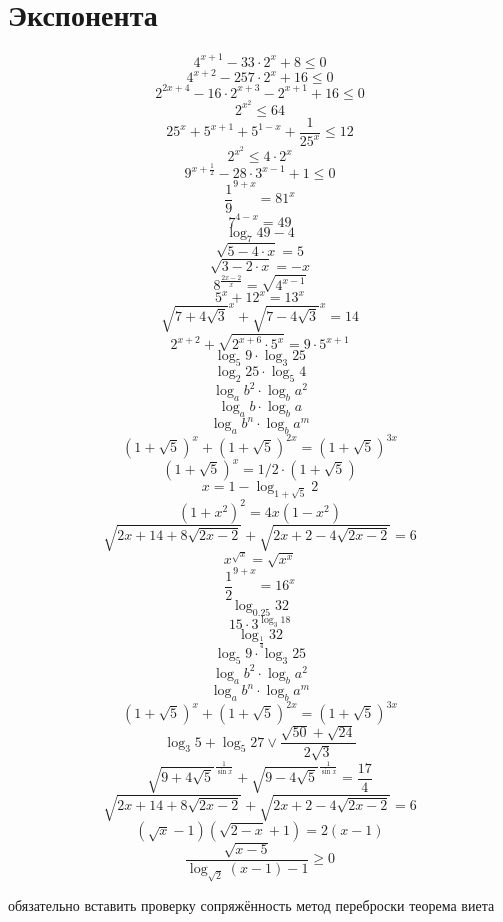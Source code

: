 \documentclass{article}
\begin{document}

\section{Экспонента}
$$4^{x+1}-33\cdot{}2^{x}+8\le{}0$$
$$4^{x+2}-257\cdot{}2^{x}+16\le{}0$$
$$2^{2x+4}-16\cdot{}2^{x+3}-2^{x+1}+16\le{}0$$
$$2^{x^2}\le{}64$$
$$25^{x}+5^{x+1}+5^{1-x}+\frac{1}{25^x}\le{}12$$
$$2^{x^2}\le{}4\cdot{}2^x$$
$$9^{x+\frac{1}{2}}-28\cdot{}3^{x-1}+1\le0$$
$${\frac{1}{9}}^{9+x}=81^{x}$$
$$7^{4-x}=49$$
$$\log_{7}{49}-4$$
$$\sqrt{5-4\cdot{}x}=5$$
$$\sqrt{3-2\cdot{}x}=-x$$
$$8^{\frac{2x-2}{x}}=\sqrt{4^{x-1}}$$
$$5^x+12^x=13^x$$
$$\sqrt{7+4\sqrt{3}}^{x}+\sqrt{7-4\sqrt{3}}^{x}=14$$
$$2^{x+2}+\sqrt{2^{x+6}\cdot{}5^x}=9\cdot{}5^{x+1}$$
$$\log_{5}{9}\cdot{}\log_{3}{25}$$
$$\log_{2}{25}\cdot{}\log_{5}{4}$$
$$\log_{a}{b^2}\cdot{}\log_{b}{a^2}$$
$$\log_{a}{b}\cdot{}\log_{b}{a}$$
$$\log_{a}{b^n}\cdot{}\log_{b}{a^m}$$
$$(1+\sqrt{5})^{x}+(1+\sqrt{5})^{2x}=(1+\sqrt{5})^{3x}$$
$$(1+\sqrt{5})^x=1/2\cdot(1+\sqrt{5})$$
$$x=1-\log_{1+\sqrt{5}}{2}$$
$$(1+x^2)^2=4x(1-x^2)$$
$$\sqrt{2x+14+8\sqrt{2x-2}}+\sqrt{2x+2-4\sqrt{2x-2}}=6$$
$$x^{\sqrt{x}}=\sqrt{x^x}$$
$${\frac{1}{2}}^{9+x}=16^{x}$$
$$\log_{0.25}{32}$$
$$15\cdot{}3^{\log_{3}{18}}$$
$$\log_{\frac{1}{4}}{32}$$
$$\log_{5}{9}\cdot\log_{3}{25}$$
$$\log_{a}{b^2}\cdot\log_{b}{a^2}$$
$$\log_a{b^n}\cdot\log_b{a^m}$$
$$(1+\sqrt{5})^x+(1+\sqrt{5})^{2x}=(1+\sqrt{5})^{3x}$$
$$\log_{3}{5}+\log_5{27} \vee \frac{\sqrt{50}+\sqrt{24}}{2\sqrt{3}}$$
$$\sqrt{9+4\sqrt{5}}^{\frac{1}{\sin{x}}}+\sqrt{9-4\sqrt{5}}^{\frac{1}{\sin{x}}}=\frac{17}{4}$$
$$\sqrt{2x+14+8\sqrt{2x-2}}+\sqrt{2x+2-4\sqrt{2x-2}}=6$$
$$(\sqrt{x}-1)(\sqrt{2-x}+1)=2(x-1)$$
$$\frac{\sqrt{x-5}}{\log_{\sqrt{2}}{(x-1)}-1}\ge{}0$$

обязательно вставить проверку
сопряжённость
метод переброски
теорема виета
\end{document}
